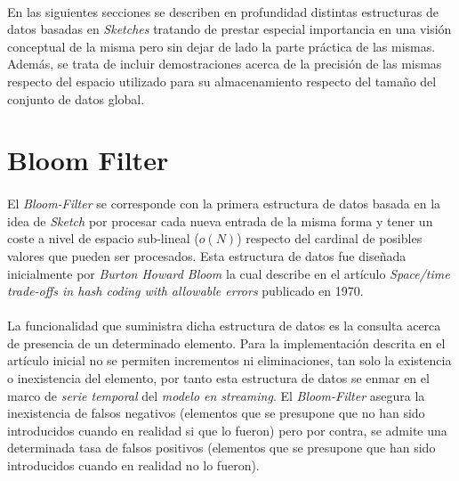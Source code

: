 \documentclass{subfiles}
\begin{document}
    \paragraph{}
    En las siguientes secciones se describen en profundidad distintas estructuras de datos basadas en \emph{Sketches} tratando de prestar especial importancia en una visión conceptual de la misma pero sin dejar de lado la parte práctica de las mismas. Además, se trata de incluir demostraciones acerca de la precisión de las mismas respecto del espacio utilizado para su almacenamiento respecto del tamaño del conjunto de datos global.


    \section{Bloom Filter}
    \label{sec:bloom_filter}

      \paragraph{}
      El \emph{Bloom-Filter} se corresponde con la primera estructura de datos basada en la idea de \emph{Sketch} por procesar cada nueva entrada de la misma forma y tener un coste a nivel de espacio sub-lineal ($o(N)$) respecto del cardinal de posibles valores que pueden ser procesados. Esta estructura de datos fue diseñada inicialmente por \emph{Burton Howard Bloom} la cual describe en el artículo \emph{Space/time trade-offs in hash coding with allowable errors} \cite{bloom1970space} publicado en 1970.

      \paragraph{}
      La funcionalidad que suministra dicha estructura de datos es la consulta acerca de presencia de un determinado elemento. Para la implementación descrita en el artículo inicial no se permiten incrementos ni eliminaciones, tan solo la existencia o inexistencia del elemento, por tanto esta estructura de datos se enmar en el marco de \emph{serie temporal} del \emph{modelo en streaming}. El \emph{Bloom-Filter} asegura la inexistencia de falsos negativos (elementos que se presupone que no han sido introducidos cuando en realidad si que lo fueron) pero por contra, se admite una determinada tasa de falsos positivos (elementos que se presupone que han sido introducidos cuando en realidad no lo fueron).
\end{document}
